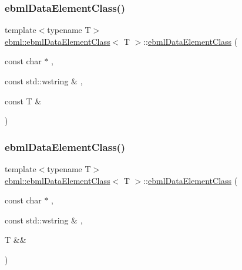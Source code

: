 \mbox{\label{classebml_1_1ebmlDataElementClass_a9041c4768574aa8a05008622c59d1505}} 
\subsubsection{\texorpdfstring{ebml\+Data\+Element\+Class()}{ebmlDataElementClass()}\hspace{0.1cm}{\footnotesize\ttfamily [2/6]}}
{\footnotesize\ttfamily template$<$typename T$>$ \\
\mbox{\hyperlink{classebml_1_1ebmlDataElementClass}{ebml\+::ebml\+Data\+Element\+Class}}$<$ T $>$\+::\mbox{\hyperlink{classebml_1_1ebmlDataElementClass}{ebml\+Data\+Element\+Class}} (\begin{DoxyParamCaption}\item[{const char $\ast$}]{,  }\item[{const std\+::wstring \&}]{,  }\item[{const T \&}]{ }\end{DoxyParamCaption})}

\mbox{\label{classebml_1_1ebmlDataElementClass_a563cc43ab0bffe8be47cd3c675ce675e}} 
\subsubsection{\texorpdfstring{ebml\+Data\+Element\+Class()}{ebmlDataElementClass()}\hspace{0.1cm}{\footnotesize\ttfamily [3/6]}}
{\footnotesize\ttfamily template$<$typename T$>$ \\
\mbox{\hyperlink{classebml_1_1ebmlDataElementClass}{ebml\+::ebml\+Data\+Element\+Class}}$<$ T $>$\+::\mbox{\hyperlink{classebml_1_1ebmlDataElementClass}{ebml\+Data\+Element\+Class}} (\begin{DoxyParamCaption}\item[{const char $\ast$}]{,  }\item[{const std\+::wstring \&}]{,  }\item[{T \&\&}]{ }\end{DoxyParamCaption})}

